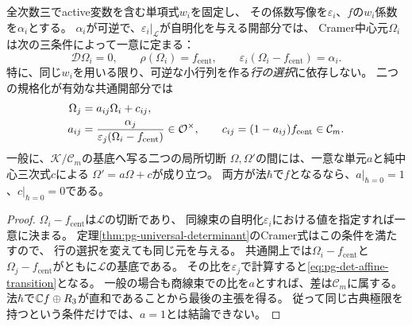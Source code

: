 \begin{proposition}[Cramer規格化の一意性と遷移]
\label{prop:pg-det-normalization-transition}
全次数三でactive変数を含む単項式$w_i$を固定し、
その係数写像を$\varepsilon_i$、$f$の$w_i$係数を$\alpha_i$とする。
$\alpha_i$が可逆で、$\varepsilon_i|_{\mathcal L}$が自明化を与える開部分では、
Cramer中心元$\Omega_i$は次の三条件によって一意に定まる：
\begin{equation}
 \mathcal D\Omega_i=0,\qquad
 \rho(\Omega_i)=f_{\mathrm{cent}},\qquad
 \varepsilon_i(\Omega_i-f_{\mathrm{cent}})=\alpha_i.
 \label{eq:pg-det-normalization-conditions}
\end{equation}
特に、同じ$w_i$を用いる限り、可逆な小行列を作る\emph{行の選択}に依存しない。
二つの規格化が有効な共通開部分では
\begin{equation}
 \begin{aligned}
 \Omega_j&=a_{ij}\Omega_i+c_{ij},\\
 a_{ij}&=
 \frac{\alpha_j}{\varepsilon_j(\Omega_i-f_{\mathrm{cent}})}
 \in\mathcal O^\times,\qquad
 c_{ij}=(1-a_{ij})f_{\mathrm{cent}}\in\mathcal C_m.
 \end{aligned}
 \label{eq:pg-det-affine-transition}
\end{equation}
一般に、$\mathcal K/\mathcal C_m$の基底へ写る二つの局所切断
$\Omega,\Omega'$の間には、一意な単元$a$と純中心三次式$c$による
$\Omega'=a\Omega+c$が成り立つ。
両方が法$\hbar$で$f$となるなら、$a|_{\hbar=0}=1$、$c|_{\hbar=0}=0$である。
\end{proposition}
\begin{proof}
$\Omega_i-f_{\mathrm{cent}}$は$\mathcal L$の切断であり、
同線束の自明化$\varepsilon_i$における値を指定すれば一意に決まる。
定理\ref{thm:pg-universal-determinant}のCramer式はこの条件を満たすので、
行の選択を変えても同じ元を与える。
共通開上では$\Omega_i-f_{\mathrm{cent}}$と
$\Omega_j-f_{\mathrm{cent}}$がともに$\mathcal L$の基底である。
その比を$\varepsilon_j$で計算すると\eqref{eq:pg-det-affine-transition}となる。
一般の場合も商線束での比を$a$とすれば、差は$\mathcal C_m$に属する。
法$\hbar$で$\mathbb C f\oplus R_3$が直和であることから最後の主張を得る。
従って同じ古典極限を持つという条件だけでは、$a=1$とは結論できない。
\end{proof}

